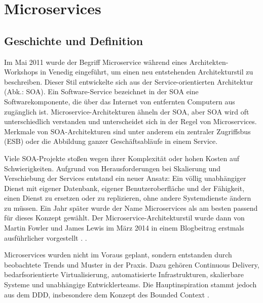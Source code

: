 {%
%
%

\pagebreak
\section{Microservices}

\subsection{Geschichte und Definition}

Im Mai 2011 wurde der Begriff \glqq Microservice\grqq{} während eines Architekten-Workshops in Venedig eingeführt, um einen neu entstehenden Architekturstil zu beschreiben. Dieser Stil entwickelte sich aus der \glqq Service-orientierten Architektur\grqq{} (Abk.: SOA). Ein Software-Service bezeichnet in der SOA eine Softwarekomponente, die über das Internet von entfernten Computern aus zugänglich ist. Microservice-Architekturen ähneln der SOA, aber SOA wird oft unterschiedlich verstanden und unterscheidet sich in der Regel von Microservices. Merkmale von SOA-Architekturen sind unter anderem ein zentraler Zugriffsbus (ESB) oder die Abbildung ganzer Geschäftsabläufe in einem Service.

Viele SOA-Projekte stoßen wegen ihrer Komplexität oder hohen Kosten auf Schwierigkeiten. Aufgrund von Herausforderungen bei Skalierung und Verschiebung der Services entstand ein neuer Ansatz: Ein völlig unabhängiger Dienst mit eigener Datenbank, eigener Benutzeroberfläche und der Fähigkeit, einen Dienst zu ersetzen oder zu replizieren, ohne andere Systemdienste ändern zu müssen. Ein Jahr später wurde der Name Microservices als am besten passend für dieses Konzept gewählt. Der Microservice-Architekturstil wurde dann von Martin Fowler und James Lewis im März 2014 in einem Blogbeitrag erstmals ausführlicher vorgestellt \cite{fowlerlewis} \cite[S.251]{richards}. \cite[S.150,151]{sommerville}.

Microservices wurden nicht im Voraus geplant, sondern entstanden durch beobachtete Trends und Muster in der Praxis. Dazu gehören Continuous Delivery, bedarfsorientierte Virtualisierung, automatisierte Infrastrukturen, skalierbare Systeme und unabhängige Entwicklerteams. Die Hauptinspiration stammt jedoch aus dem DDD, insbesondere dem Konzept des Bounded Context \cite[S.21]{newman} \cite[S.251]{richards}.

}

